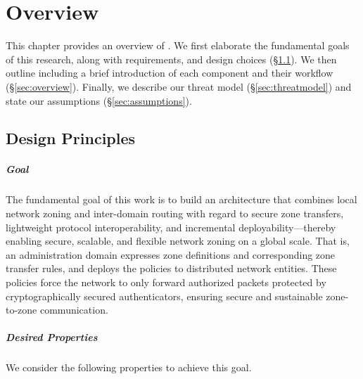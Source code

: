 \chapter{Overview}
\label{overview}

This chapter provides an overview of \name. We first elaborate the fundamental goals
of this research, along with requirements, and design choices (\S\ref{sec:design}).
We then outline \name including a brief introduction of each component and their
workflow (\S\ref{sec:overview}). Finally, we describe our threat model
(\S\ref{sec:threatmodel}) and state our assumptions (\S\ref{sec:assumptions}).

\section{Design Principles}
\label{sec:design}

\paragraph{Goal}
The fundamental goal of this work is to build an architecture that combines local
network zoning and inter-domain routing with regard to secure zone transfers, lightweight protocol interoperability,
and incremental deployability---thereby enabling secure,
scalable, and flexible network zoning on a global scale. That is, an administration
domain expresses zone definitions and corresponding zone transfer rules, and
deploys the policies to distributed network entities. These policies force the
network to only forward authorized packets protected by cryptographically
secured authenticators, ensuring secure and sustainable zone-to-zone communication.

\paragraph{Desired Properties}
We consider the following properties to achieve this goal.

